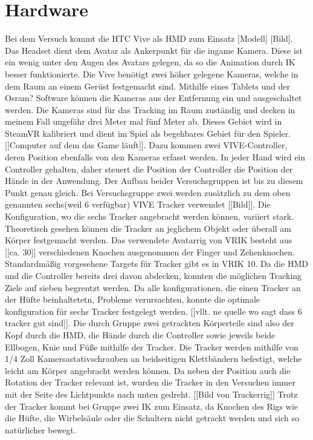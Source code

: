 \section{Hardware}
Bei dem Versuch kommt die HTC Vive als HMD zum Einsatz [Modell] [Bild]. Das Headset dient dem Avatar als Ankerpunkt für die ingame Kamera. Diese ist ein wenig unter den Augen des Avatars gelegen, da so die Animation durch IK besser funktionierte.
Die Vive benötigt zwei höher gelegene Kameras, welche in dem Raum an einem Gerüst festgemacht sind. Mithilfe eines Tablets und der Osram? Software können die Kameras aus der Entfernung ein und ausgeschaltet werden. Die Kameras sind für das Tracking im Raum zuständig und decken in meinem Fall ungefähr drei Meter mal fünf Meter ab. Dieses Gebiet wird in SteamVR kalibriert und dient im Spiel als begehbares Gebiet für den Spieler. [[Computer auf dem das Game läuft]].
Dazu kommen zwei VIVE-Controller, deren Position ebenfalls von den Kameras erfasst werden. In jeder Hand wird ein Controller gehalten, daher steuert die Position der Controller die Position der Hände in der Anwendung.  Der Aufbau beider Versuchsgruppen ist bis zu diesem Punkt genau gleich.
Bei Versuchsgruppe zwei werden zusätzlich zu dem oben genannten sechs(weil 6 verfügbar) VIVE Tracker verwendet [[Bild]]. Die Konfiguration, wo die sechs Tracker angebracht werden können, variiert stark. Theoretisch gesehen können die Tracker an jeglichem Objekt oder überall am Körper festgemacht werden. Das verwendete Avatarrig von VRIK besteht aus [[ca. 30]] verschiedenen Knochen ausgenommen der Finger und Zehenknochen. Standardmäßig vorgesehene Targets für Tracker gibt es in VRIK 10. Da die HMD und die Controller bereits drei davon abdecken, konnten die möglichen Tracking Ziele auf sieben begrentzt werden. Da alle konfigurationen, die einen Tracker an der Hüfte beinhaltetetn, Probleme verursachten, konnte die optimale konfiguration für sechs Tracker festgelegt werden. [[vllt. ne quelle wo sagt dass 6 tracker gut sind]]. Die durch Gruppe zwei getrackten Körperteile sind also der Kopf durch die HMD, die Hände durch die Controller sowie jeweils beide Ellbogen, Knie und Füße mithilfe der Tracker. 
Die Tracker werden mithilfe von 1/4 Zoll Kamersastativschrauben an beidseitigen Klettbändern befestigt, welche leicht am Körper angebracht werden können. Da neben der Position auch die Rotation der Tracker relevant ist, wurden die Tracker in den Versuchen immer mit der Seite des Lichtpunkts nach unten gedreht. [[Bild von Trackerrig]]
Trotz der Tracker kommt bei Gruppe zwei IK zum Einsatz, da Knochen des Rigs wie die Hüfte, die Wirbelsäule oder die Schultern nicht getrackt werden und sich so natürlicher bewegt.

